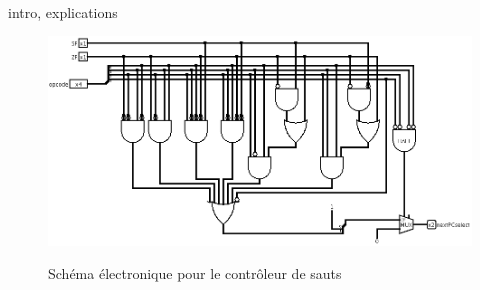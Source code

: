 \paragraph{}{
	intro, explications
}

\begin{figure}
	\includegraphics[scale=0.4]{circuits/control_saut.png}
	\label{selec_reg_circ}
	\caption{Sch\'{e}ma \'{e}lectronique pour le contr\^{o}leur de sauts}
\end{figure}